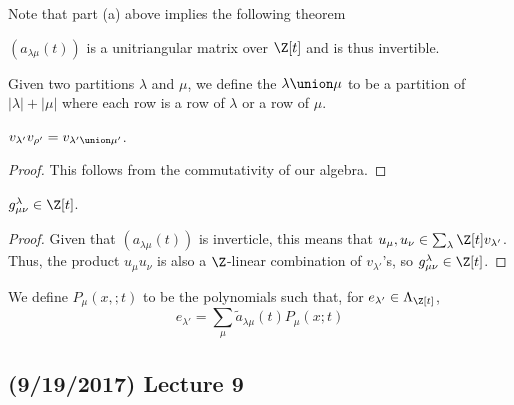 \documentclass[11pt,leqno,oneside]{amsbook}
\numberwithin{thm}{section}
\begin{document}
Note that part (a) above implies the following theorem
\begin{thm}
  \((a_{\lambda \mu}(t))\) is a unitriangular matrix over \(\Z[t]\)
  and is thus invertible. 
\end{thm}
\begin{defn}
  Given two partitions \(\lambda\) and \(\mu\), we define the
   \(\lambda \union \mu\) to be a partition of
  \(|\lambda|+|\mu|\) where each row is a row of \(\lambda\) or a row
  of \(\mu\).
\end{defn}
\begin{lem}
  \(v_{\lambda'} v_{\rho'} = v_{\lambda' \union \mu'}\).
\end{lem}
\begin{proof}
  This follows from the commutativity of our algebra.
\end{proof}
\begin{prop}
  \(g_{\mu \nu}^{\lambda} \in \Z[t]\). 
\end{prop}
\begin{proof}
  Given that \((a_{\lambda \mu}(t))\) is inverticle, this means that
  \(u_\mu, u_\nu \in \sum_{\lambda} \Z[t] v_{\lambda'}\). Thus, the
  product \(u_\mu u_\nu\) is also a \(\Z\)-linear combination of
  \(v_{\lambda'}\)'s, so \(g_{\mu \nu}^\lambda \in \Z[t]\).
\end{proof}
\begin{defn}
  We define \(P_\mu(x,;t)\) to be the polynomials such that, for
  \(e_{\lambda'} \in \Lambda_{\Z[t]}\), \[
    e_{\lambda'} = \sum_{\mu} \tilde{a}_{\lambda \mu}(t) P_\mu(x;t)
  \]
\end{defn}
\subsection*{(9/19/2017) Lecture 9}
\end{document}
